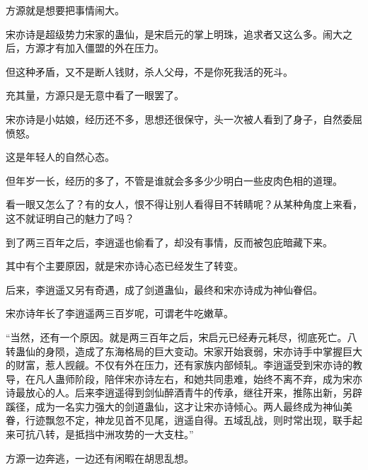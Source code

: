 \begin{this_body}
方源就是想要把事情闹大。

宋亦诗是超级势力宋家的蛊仙，是宋启元的掌上明珠，追求者又这么多。闹大之后，方源才有加入僵盟的外在压力。

但这种矛盾，又不是断人钱财，杀人父母，不是你死我活的死斗。

充其量，方源只是无意中看了一眼罢了。

宋亦诗是小姑娘，经历还不多，思想还很保守，头一次被人看到了身子，自然委屈愤怒。

这是年轻人的自然心态。

但年岁一长，经历的多了，不管是谁就会多多少少明白一些皮肉色相的道理。

看一眼又怎么了？有的女人，恨不得让别人看得目不转睛呢？从某种角度上来看，这不就证明自己的魅力了吗？

到了两三百年之后，李逍遥也偷看了，却没有事情，反而被包庇暗藏下来。

其中有个主要原因，就是宋亦诗心态已经发生了转变。

后来，李逍遥又另有奇遇，成了剑道蛊仙，最终和宋亦诗成为神仙眷侣。

宋亦诗年长了李逍遥两三百岁呢，可谓老牛吃嫩草。

“当然，还有一个原因。就是两三百年之后，宋启元已经寿元耗尽，彻底死亡。八转蛊仙的身陨，造成了东海格局的巨大变动。宋家开始衰弱，宋亦诗手中掌握巨大的财富，惹人觊觎。不仅有外在压力，还有家族内部倾轧。李逍遥受到宋亦诗的教导，在凡人蛊师阶段，陪伴宋亦诗左右，和她共同患难，始终不离不弃，成为宋亦诗最放心的人。后来李逍遥得到剑仙醉酒青牛的传承，继往开来，推陈出新，另辟蹊径，成为一名实力强大的剑道蛊仙，这才让宋亦诗倾心。两人最终成为神仙美眷，行迹飘忽不定，神龙见首不见尾，逍遥自得。五域乱战，则时常出现，联手起来可抗八转，是抵挡中洲攻势的一大支柱。”

方源一边奔逃，一边还有闲暇在胡思乱想。

\end{this_body}

